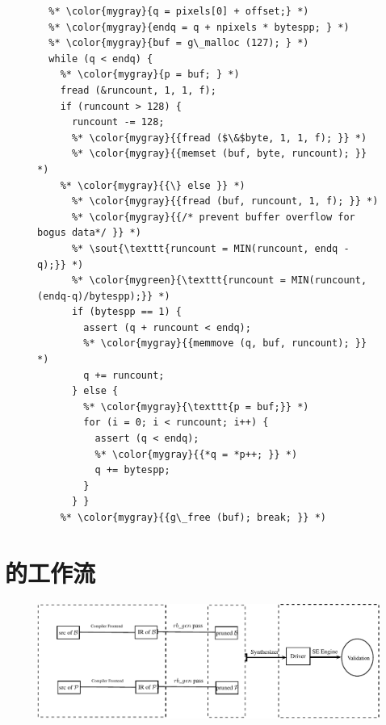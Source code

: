 \begin{figure}[t]
\begin{center}
\begin{lstlisting}[language={[ANSI]C}]
%* \color{mygray}{case PSP\_COMP\_RLE: { } *)
  %* \color{mygray}{q = pixels[0] + offset;} *)
  %* \color{mygray}{endq = q + npixels * bytespp; } *)
  %* \color{mygray}{buf = g\_malloc (127); } *)
  while (q < endq) {
    %* \color{mygray}{p = buf; } *)
    fread (&runcount, 1, 1, f);
    if (runcount > 128) {
      runcount -= 128;
      %* \color{mygray}{{fread ($\&$byte, 1, 1, f); }} *)
      %* \color{mygray}{{memset (buf, byte, runcount); }} *)
    %* \color{mygray}{{\} else }} *)
      %* \color{mygray}{{fread (buf, runcount, 1, f); }} *)
      %* \color{mygray}{{/* prevent buffer overflow for bogus data*/ }} *)
      %* \sout{\texttt{runcount = MIN(runcount, endq - q);}} *)
      %* \color{mygreen}{\texttt{runcount = MIN(runcount, (endq-q)/bytespp);}} *)
      if (bytespp == 1) {
        assert (q + runcount < endq);
        %* \color{mygray}{{memmove (q, buf, runcount); }} *)
        q += runcount;
      } else {
        %* \color{mygray}{\texttt{p = buf;}} *)
        for (i = 0; i < runcount; i++) {
          assert (q < endq);
          %* \color{mygray}{{*q = *p++; }} *)
          q += bytespp;
        }
      } }
    %* \color{mygray}{{g\_free (buf); break; }} *)
\end{lstlisting}
\vspace{-0.5cm}
\end{center}
\end{figure}


\section{\dryrun 的工作流}
\label{sec:dryrun_workflow}

\begin{figure}[t]
\begin{center}
\includegraphics[width=\textwidth]{fig/workflow.pdf}
\end{center}
\end{figure}

